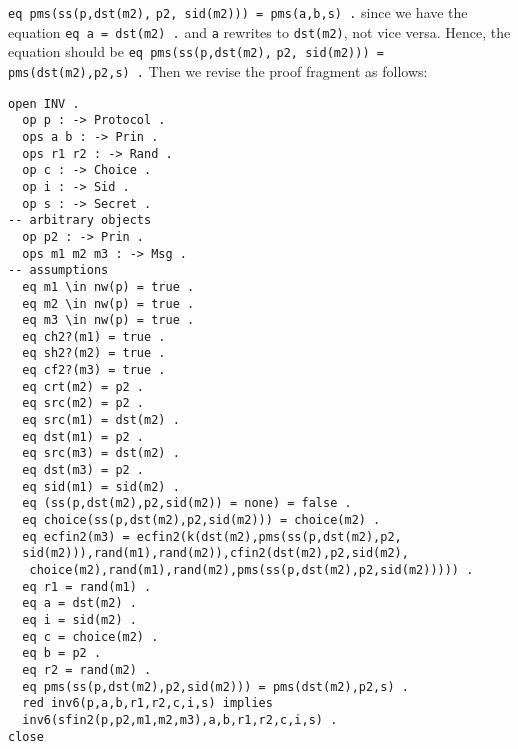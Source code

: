 \documentclass[a4paper,fleqn]{cas-dc}
\begin{document}
\verb!eq pms(ss(p,dst(m2),! \verb!p2, sid(m2))) = pms(a,b,s) .!
since we have the equation \verb!eq a = dst(m2) .! and \verb!a! rewrites to \verb!dst(m2)!, not vice versa. Hence, the equation should be \verb!eq pms(ss(p,dst(m2),! \verb!p2, sid(m2))) = pms(dst(m2),p2,s) .! Then we revise the proof fragment as follows:
\begin{small}
\begin{verbatim}
open INV .
  op p : -> Protocol .
  ops a b : -> Prin .
  ops r1 r2 : -> Rand .
  op c : -> Choice .
  op i : -> Sid .
  op s : -> Secret .
-- arbitrary objects
  op p2 : -> Prin .
  ops m1 m2 m3 : -> Msg .
-- assumptions
  eq m1 \in nw(p) = true .
  eq m2 \in nw(p) = true .
  eq m3 \in nw(p) = true .
  eq ch2?(m1) = true .
  eq sh2?(m2) = true .
  eq cf2?(m3) = true .
  eq crt(m2) = p2 .
  eq src(m2) = p2 .
  eq src(m1) = dst(m2) .
  eq dst(m1) = p2 .
  eq src(m3) = dst(m2) .
  eq dst(m3) = p2 .
  eq sid(m1) = sid(m2) .
  eq (ss(p,dst(m2),p2,sid(m2)) = none) = false .
  eq choice(ss(p,dst(m2),p2,sid(m2))) = choice(m2) .
  eq ecfin2(m3) = ecfin2(k(dst(m2),pms(ss(p,dst(m2),p2,
  sid(m2))),rand(m1),rand(m2)),cfin2(dst(m2),p2,sid(m2),
   choice(m2),rand(m1),rand(m2),pms(ss(p,dst(m2),p2,sid(m2))))) .
  eq r1 = rand(m1) .
  eq a = dst(m2) .
  eq i = sid(m2) .
  eq c = choice(m2) .
  eq b = p2 .
  eq r2 = rand(m2) .
  eq pms(ss(p,dst(m2),p2,sid(m2))) = pms(dst(m2),p2,s) .
  red inv6(p,a,b,r1,r2,c,i,s) implies
  inv6(sfin2(p,p2,m1,m2,m3),a,b,r1,r2,c,i,s) .
close
\end{verbatim}
\end{small}
\end{document}
